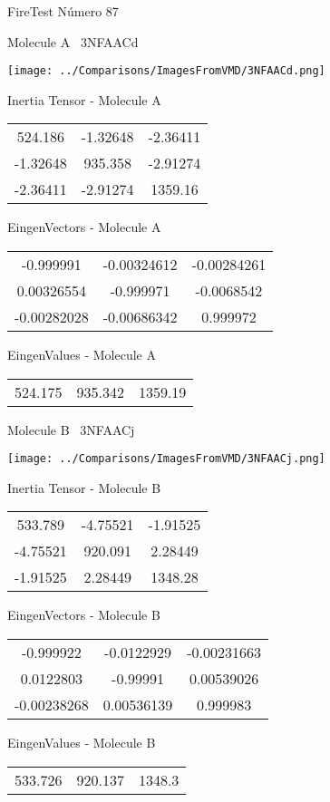 \vtab[-3cm]
\begin{center}
{\large FireTest \tab Número 87}
\end{center}
\begin{multicols}{2}
\begin{center}

Molecule A \
3NFAACd

\texttt{[image: ../Comparisons/ImagesFromVMD/3NFAACd.png]}

Inertia Tensor - Molecule A \\
\begin{tabular}{|c c c|}
524.186	 & 	-1.32648	 & 	-2.36411	 \\
-1.32648	 & 	935.358	 & 	-2.91274	 \\
-2.36411	 & 	-2.91274	 & 	1359.16
\end{tabular}

\vtab
 EingenVectors - Molecule A     \\
\begin{tabular}{|c c c|}
-0.999991	 & 	-0.00324612	 & 	-0.00284261	 \\
0.00326554	 & 	-0.999971	 & 	-0.0068542	 \\
-0.00282028	 & 	-0.00686342	 & 	0.999972
\end{tabular}

\vtab
 EingenValues - Molecule A     \\
\begin{tabular}{|c c c|}
524.175	 & 	935.342	 & 	1359.19	 \\
\end{tabular}
\columnbreak

Molecule B \
3NFAACj

\texttt{[image: ../Comparisons/ImagesFromVMD/3NFAACj.png]}

Inertia Tensor - Molecule B \\
\begin{tabular}{|c c c|}
533.789	 & 	-4.75521	 & 	-1.91525	 \\
-4.75521	 & 	920.091	 & 	2.28449	 \\
-1.91525	 & 	2.28449	 & 	1348.28
\end{tabular}

\vtab
 EingenVectors - Molecule B     \\
\begin{tabular}{|c c c|}
-0.999922	 & 	-0.0122929	 & 	-0.00231663	 \\
0.0122803	 & 	-0.99991	 & 	0.00539026	 \\
-0.00238268	 & 	0.00536139	 & 	0.999983
\end{tabular}

\vtab
 EingenValues - Molecule B     \\
\begin{tabular}{|c c c|}
533.726	 & 	920.137	 & 	1348.3	 \\
\end{tabular}

\end{center}
\end{multicols}


